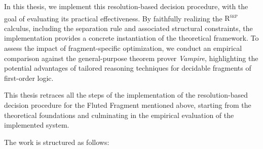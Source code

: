 In this thesis, we implement this resolution-based decision procedure, with the goal of evaluating its practical effectiveness.
By faithfully realizing the \textsc{R\textsuperscript{sep}} calculus, including the separation rule and associated structural constraints, the implementation provides a concrete instantiation of the theoretical framework.
To assess the impact of fragment-specific optimization, we conduct an empirical comparison against the general-purpose theorem prover \emph{Vampire}, highlighting the potential advantages of tailored reasoning techniques for decidable fragments of first-order logic.


This thesis retraces all the steps of the implementation of the resolution-based decision procedure for the Fluted Fragment mentioned above, starting from the theoretical foundations and culminating in the empirical evaluation of the implemented system.

The work is structured as follows:


